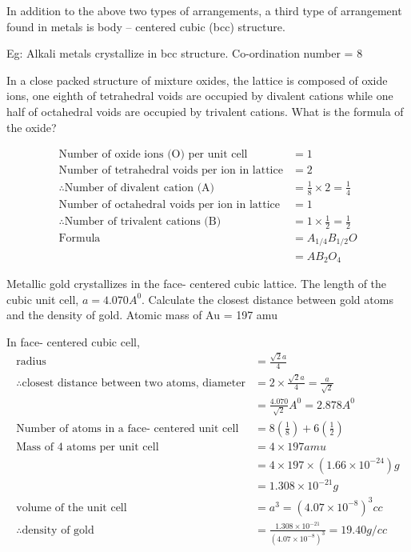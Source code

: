 \begin{note}
	In addition to the above two types of arrangements, a third type of arrangement found in metals is body – centered cubic (bcc) structure. 
\end{note}
Eg: Alkali metals crystallize in bcc structure. Co-ordination number = 8\\
\begin{exercise}
	In a close packed structure of mixture oxides, the lattice is composed of oxide ions, one eighth of tetrahedral voids are occupied by divalent cations while one half of octahedral voids are occupied by trivalent cations. What is the formula of the oxide?
\end{exercise}
\begin{answer}
	$$\begin{aligned}
	\text{Number of oxide ions (O) per unit cell}&= 1\\
	\text{Number of tetrahedral voids per ion in lattice}&= 2\\
	\therefore \text{Number of divalent cation (A)} &= \frac{1}{8} \times 2 = \frac{1}{4}\\
	\text{Number of octahedral voids per ion in lattice}&= 1\\
	\therefore \text{Number of trivalent cations (B)}&= 1 \times \frac{1}{2} = \frac{1}{2}\\
	\text{Formula} &=A_{1/4}B_{1/2}O\\ &= AB_{2}O_{4}
	\end{aligned}$$
\end{answer}
\begin{exercise}
	Metallic gold crystallizes in the face- centered cubic lattice. The length of the cubic unit cell, $a = 4.070 A^{0}$. Calculate the closest distance between gold atoms and the density of gold. Atomic mass of Au = 197 amu
\end{exercise}
\begin{answer}
	In face- centered cubic cell,\\
	\begin{align*}
	\text{radius} &= \frac{\sqrt{2}a}{4}\\
	\therefore \text{closest distance between two atoms, diameter} &= 2 \times \frac{\sqrt{2}a}{4} = \frac{a}{\sqrt{2}}\\
	&= \frac{4.070}{\sqrt{2}} A^{0} = 2.878 A^{0}\\
	\text{Number of atoms in a face- centered unit cell} &= 8\left( \frac{1}{8}\right) + 6\left( \frac{1}{2}\right)\\
	\text{Mass of 4 atoms per unit cell} &= 4 \times 197 amu\\
	&= 4 \times 197 \times \left( 1.66 \times 10^{-24}\right) g\\
	&= 1.308 \times 10^{-21}g\\
	\text{volume of the unit cell}&= a^{3}= \left( 4.07 \times 10^{-8}\right) ^{3}cc\\
	\therefore \text{density of gold}&= \frac{1.308 \times 10^{-21}}{\left( 4.07 \times 10^{-8}\right) ^{3}} = 19.40 g/cc
	\end{align*}
\end{answer}
